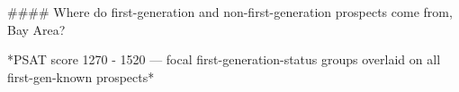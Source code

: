 #### Where do first-generation and non-first-generation prospects come from, Bay Area?

*PSAT score 1270 - 1520 — focal first-generation-status groups overlaid on all first-gen-known prospects*
